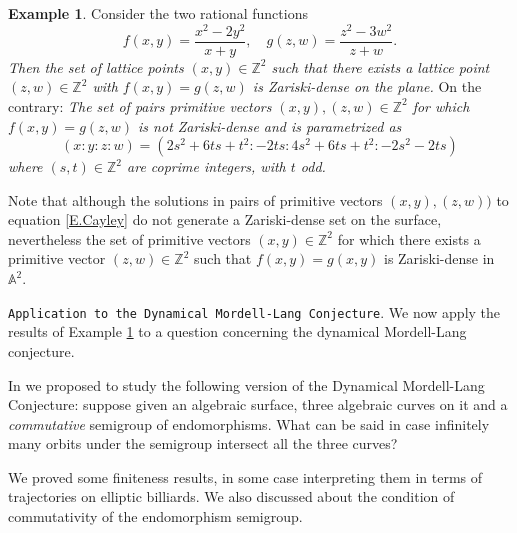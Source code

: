 \documentclass[leqno,12pt]{article} %
\def\A{{{\mathbb A}}}
\def\Z{{{\mathbb Z}}}
\theoremstyle{plain} %
\theoremstyle{definition} %
\newtheorem{example}[theorem]{\indent\sc Example}
\begin{document}
\begin{example}\label{Ex.Cayley}
Consider the two rational functions 
$$
f(x,y)=\frac{x^2-2y^2}{x+y}, \quad g(z,w)=\frac{z^2-3w^2}{z+w}.
$$
{\it Then the set of lattice points $(x,y)\in\Z^2$ such that there exists a lattice point $(z,w)\in\Z^2$  with  $f(x,y)=g(z,w)$ is Zariski-dense on the plane.} On the contrary: {\it 
The set of pairs primitive vectors $(x,y), (z,w) \in \Z^2$ for which   $f(x,y)=g(z,w)$ is not Zariski-dense and is parametrized as
\begin{equation}\label{E.parametrization}
(x:y:z:w)=(2s^2+6ts+t^2:-2ts:4s^2+6ts+t^2:-2s^2-2ts)
\end{equation}
where $(s,t)\in\Z^2$ are coprime integers, with $t$ odd.}
 \end{example}

Note that although the solutions in pairs  of primitive vectors $(x,y),(z,w))$ to equation \eqref{E.Cayley} do not generate a Zariski-dense set on the surface, nevertheless the set of primitive vectors $(x,y)\in\Z^2$ for which there exists a primitive vector $(z,w)\in\Z^2$ such that $f(x,y)=g(x,y)$ is Zariski-dense in $\A^2$. 

\medskip

{\tt Application to the Dynamical Mordell-Lang Conjecture}. We now apply the results of Example \ref{Ex.Cayley} to a question concerning the dynamical Mordell-Lang conjecture.

 In \cite{CZbilliards} we proposed to study the following version of the Dynamical Mordell-Lang Conjecture: suppose given an algebraic surface, three algebraic curves on it  and a {\it commutative} semigroup of endomorphisms. What can be said in  case infinitely many orbits under the semigroup intersect all the three curves?

We proved some finiteness results, in some case interpreting them in terms of  trajectories on elliptic billiards. We also discussed about the condition of commutativity of the endomorphism semigroup.
\end{document}
